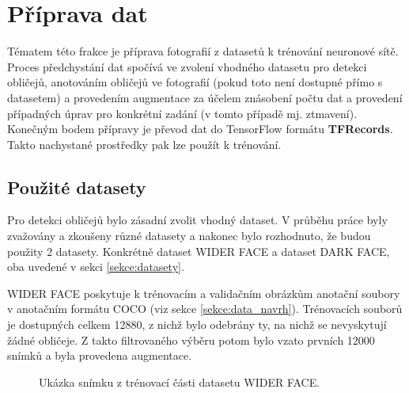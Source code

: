 \section{Příprava dat}
\label{sekce:priprava_dat}
Tématem této frakce je příprava fotografií z datasetů k trénování neuronové sítě. Proces předchystání dat spočívá ve zvolení vhodného datasetu pro detekci obličejů, anotováním obličejů ve fotografií (pokud toto není dostupné přímo s datasetem) a provedením augmentace za účelem znásobení počtu dat a provedení případných úprav pro konkrétní zadání (v tomto případě mj. ztmavení). Konečným bodem přípravy je převod dat do TensorFlow formátu \textbf{TFRecords}. Takto nachystané prostředky pak lze použít k trénování.

\subsection*{Použité datasety}
Pro detekci obličejů bylo zásadní zvolit vhodný dataset. V průběhu práce byly zvažovány a zkoušeny různé datasety a nakonec bylo rozhodnuto, že budou použity 2 datasety. Konkrétně dataset WIDER FACE a dataset DARK FACE, oba uvedené v sekci \ref{sekce:datasety}.

WIDER FACE poskytuje k trénovacím a validačním obrázkům anotační soubory v anotačním formátu COCO (viz sekce \ref{sekce:data_navrh}). Trénovacích souborů je dostupných celkem 12880, z nichž bylo odebrány ty, na nichž se nevyskytují žádné obličeje. Z takto filtrovaného výběru potom bylo vzato prvních 12000 snímků a byla provedena augmentace.

\begin{figure}[H]
  \begin{center}
  \label{obrazek:widerfaceexample}
  \caption{Ukázka snímku z trénovací části datasetu WIDER FACE.}
  \end{center}
\end{figure}


